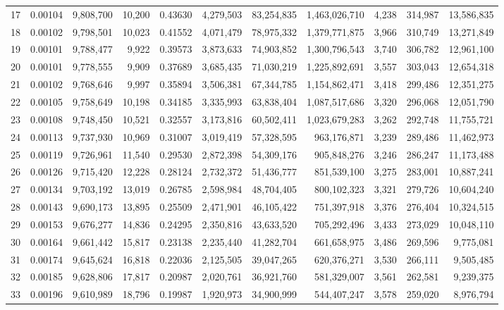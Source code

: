\begin{landscape}
\begin{longtable}{rrrrrrrrrrr}
17 & 0.00104 & 9,808,700 & 10,200 & 0.43630 & 4,279,503 & 83,254,835 & 1,463,026,710 & 4,238 & 314,987 & 13,586,835 \\
18 & 0.00102 & 9,798,501 & 10,023 & 0.41552 & 4,071,479 & 78,975,332 & 1,379,771,875 & 3,966 & 310,749 & 13,271,849 \\
19 & 0.00101 & 9,788,477 & 9,922 & 0.39573 & 3,873,633 & 74,903,852 & 1,300,796,543 & 3,740 & 306,782 & 12,961,100 \\
20 & 0.00101 & 9,778,555 & 9,909 & 0.37689 & 3,685,435 & 71,030,219 & 1,225,892,691 & 3,557 & 303,043 & 12,654,318 \\
21 & 0.00102 & 9,768,646 & 9,997 & 0.35894 & 3,506,381 & 67,344,785 & 1,154,862,471 & 3,418 & 299,486 & 12,351,275 \\
22 & 0.00105 & 9,758,649 & 10,198 & 0.34185 & 3,335,993 & 63,838,404 & 1,087,517,686 & 3,320 & 296,068 & 12,051,790 \\
23 & 0.00108 & 9,748,450 & 10,521 & 0.32557 & 3,173,816 & 60,502,411 & 1,023,679,283 & 3,262 & 292,748 & 11,755,721 \\
24 & 0.00113 & 9,737,930 & 10,969 & 0.31007 & 3,019,419 & 57,328,595 & 963,176,871 & 3,239 & 289,486 & 11,462,973 \\
25 & 0.00119 & 9,726,961 & 11,540 & 0.29530 & 2,872,398 & 54,309,176 & 905,848,276 & 3,246 & 286,247 & 11,173,488 \\
26 & 0.00126 & 9,715,420 & 12,228 & 0.28124 & 2,732,372 & 51,436,777 & 851,539,100 & 3,275 & 283,001 & 10,887,241 \\
27 & 0.00134 & 9,703,192 & 13,019 & 0.26785 & 2,598,984 & 48,704,405 & 800,102,323 & 3,321 & 279,726 & 10,604,240 \\
28 & 0.00143 & 9,690,173 & 13,895 & 0.25509 & 2,471,901 & 46,105,422 & 751,397,918 & 3,376 & 276,404 & 10,324,515 \\
29 & 0.00153 & 9,676,277 & 14,836 & 0.24295 & 2,350,816 & 43,633,520 & 705,292,496 & 3,433 & 273,029 & 10,048,110 \\
30 & 0.00164 & 9,661,442 & 15,817 & 0.23138 & 2,235,440 & 41,282,704 & 661,658,975 & 3,486 & 269,596 & 9,775,081 \\
31 & 0.00174 & 9,645,624 & 16,818 & 0.22036 & 2,125,505 & 39,047,265 & 620,376,271 & 3,530 & 266,111 & 9,505,485 \\
32 & 0.00185 & 9,628,806 & 17,817 & 0.20987 & 2,020,761 & 36,921,760 & 581,329,007 & 3,561 & 262,581 & 9,239,375 \\
33 & 0.00196 & 9,610,989 & 18,796 & 0.19987 & 1,920,973 & 34,900,999 & 544,407,247 & 3,578 & 259,020 & 8,976,794 \\

\end{longtable}
\end{landscape}
